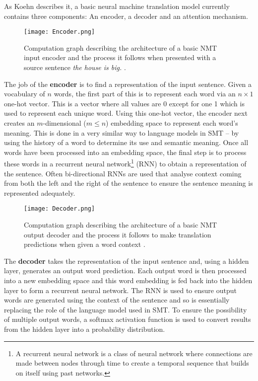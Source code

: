 \documentclass[11pt]{article}
\begin{document}
\bigskip

As Koehn \citeyearpar[ch. 8]{koehn2020} describes it, a basic neural machine translation model currently contains three components: An encoder, a decoder and an attention mechanism.

\bigskip


\begin{figure}[h]
    \centering
    \texttt{[image: Encoder.png]}
    \caption{Computation graph describing the architecture of a basic NMT input encoder and the process it follows when presented with a source sentence \textit{the house is big.} \citep[p. 127]{koehn2020}.}
    \label{fig:encoder}
\end{figure}

The job of the \textbf{encoder} is to find a representation of the input sentence. Given a vocabulary of $n$ words, the first part of this is to represent each word via an $n \times 1$ one-hot vector. This is a vector where all values are 0 except for one 1 which is used to represent each unique word. Using this one-hot vector, the encoder next creates an $m$-dimensional ($m \leq n$) embedding space to represent each word's meaning. This is done in a very similar way to language models in SMT -- by using the history of a word to determine its use and semantic meaning. Once all words have been processed into an embedding space, the final step is to process these words in a recurrent neural network\footnote{A recurrent neural network is a class of neural network where connections are made between nodes through time to create a temporal sequence that builds on itself using past networks.} (RNN) to obtain a representation of the sentence. Often bi-directional RNNs are used that analyse context coming from both the left and the right of the sentence to ensure the sentence meaning is represented adequately.


\bigskip

\begin{figure}[h]
    \centering
    \texttt{[image: Decoder.png]}
    \caption{Computation graph describing the architecture of a basic NMT output decoder and the process it follows to make translation predictions when given a word context \citep[p. 128]{koehn2020}.}
    \label{fig:decoder}
\end{figure}

The \textbf{decoder} takes the representation of the input sentence and, using a hidden layer, generates an output word prediction. Each output word is then processed into a new embedding space and this word embedding is fed back into the hidden layer to form a recurrent neural network. The RNN is used to ensure output words are generated using the context of the sentence and so is essentially replacing the role of the language model used in SMT. To ensure the possibility of multiple output words, a softmax activation function is used to convert results from the hidden layer into a probability distribution.
\end{document}
